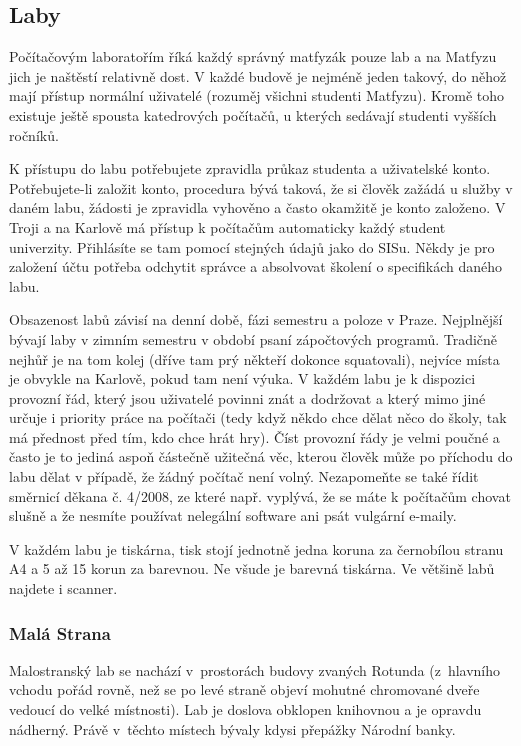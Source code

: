 \subsection{Laby}

Počítačovým laboratořím říká každý správný matfyzák pouze lab a na Matfyzu jich je naštěstí relativně dost. V každé
budově je nejméně jeden takový, do něhož mají přístup normální uživatelé (rozuměj všichni studenti Matfyzu). Kromě toho
existuje ještě spousta katedrových počítačů, u kterých sedávají studenti vyšších ročníků.

K přístupu do labu potřebujete zpravidla průkaz studenta a uživatelské konto. Potřebujete-li založit konto, procedura
bývá taková, že si člověk zažádá u služby v daném labu, žádosti je zpravidla vyhověno a často okamžitě je konto
založeno. V Troji a na Karlově má přístup k počítačům automaticky každý student univerzity. Přihlásíte se tam pomocí
stejných údajů jako do SISu. Někdy je pro založení účtu potřeba odchytit správce a absolvovat školení o specifikách
daného labu.

Obsazenost labů závisí na denní době, fázi semestru a poloze v Praze. Nejplnější bývají laby v zimním semestru v období
psaní zápočtových programů. Tradičně nejhůř je na tom kolej (dříve tam prý někteří dokonce squatovali), nejvíce místa je
obvykle na Karlově, pokud tam není výuka. V každém labu je k dispozici provozní řád, který jsou uživatelé povinni znát a
dodržovat a který mimo jiné určuje i priority práce na počítači (tedy když někdo chce dělat něco do školy, tak má
přednost před tím, kdo chce hrát hry). Číst provozní řády je velmi poučné a často je to jediná aspoň částečně užitečná
věc, kterou člověk může po příchodu do labu dělat v případě, že žádný počítač není volný. Nezapomeňte se také řídit
směrnicí děkana č. 4/2008, ze které např. vyplývá, že se máte k počítačům chovat slušně a že nesmíte používat nelegální
software ani psát vulgární e-maily.

V každém labu je tiskárna, tisk stojí jednotně jedna koruna za černobílou stranu A4 a 5 až 15 korun za barevnou. Ne
všude je barevná tiskárna. Ve většině labů najdete i scanner.


\subsubsection{Malá Strana}

Malostranský lab se nachází v~prostorách budovy zvaných Rotunda
(z~hlavního vchodu pořád rovně, než se po levé straně objeví mohutné
chromované dveře vedoucí do velké místnosti). Lab je doslova
obklopen knihovnou a je opravdu nádherný. Právě v~těchto místech
bývaly kdysi přepážky Národní banky.

